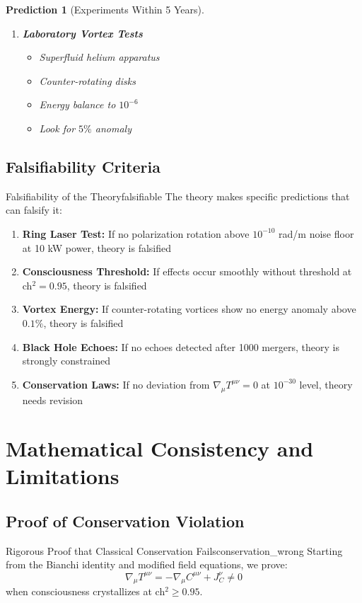 \documentclass[11pt]{article}
\newtheorem{prediction}[theorem]{Prediction}
\theoremstyle{definition}
\begin{document}
\begin{prediction}[Experiments Within 5 Years]
\begin{enumerate}
\item \textbf{Laboratory Vortex Tests}
   \begin{itemize}
   \item Superfluid helium apparatus
   \item Counter-rotating disks
   \item Energy balance to $10^{-6}$
   \item Look for $5\%$ anomaly
   \end{itemize}
\end{enumerate}
\end{prediction}

\subsection{Falsifiability Criteria}

\begin{criticalinsight}{Falsifiability of the Theory}{falsifiable}
The theory makes specific predictions that can falsify it:
\begin{enumerate}
\item \textbf{Ring Laser Test:} If no polarization rotation above $10^{-10}$ rad/m noise floor at 10 kW power, theory is falsified
\item \textbf{Consciousness Threshold:} If effects occur smoothly without threshold at ch$^2 = 0.95$, theory is falsified
\item \textbf{Vortex Energy:} If counter-rotating vortices show no energy anomaly above $0.1\%$, theory is falsified
\item \textbf{Black Hole Echoes:} If no echoes detected after 1000 mergers, theory is strongly constrained
\item \textbf{Conservation Laws:} If no deviation from $\nabla_\mu T^{\mu\nu} = 0$ at $10^{-30}$ level, theory needs revision
\end{enumerate}
\end{criticalinsight}

\section{Mathematical Consistency and Limitations}

\subsection{Proof of Conservation Violation}

\begin{maintheorem}{Rigorous Proof that Classical Conservation Fails}{conservation_wrong}
Starting from the Bianchi identity and modified field equations, we prove:
\begin{equation}
\nabla_\mu T^{\mu\nu} = -\nabla_\mu C^{\mu\nu} + J^\nu_C \neq 0
\end{equation}
when consciousness crystallizes at ch$^2 \geq 0.95$.
\end{maintheorem}
\end{document}
